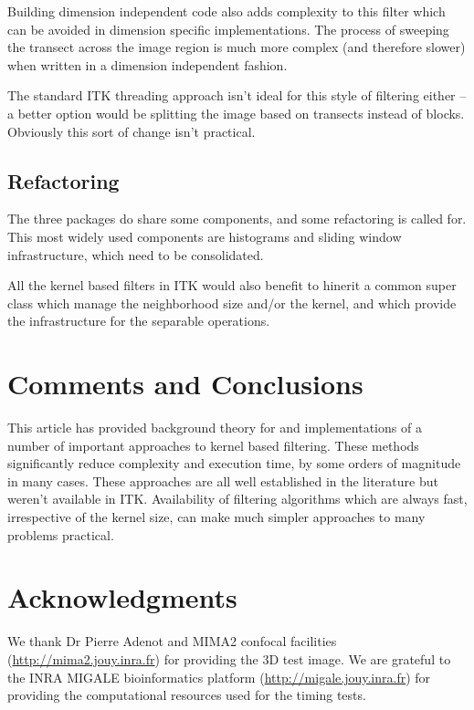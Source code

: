\documentclass{InsightArticle}
\begin{document}
Building dimension independent code also adds complexity to this filter which can be avoided in
dimension specific implementations. The process of sweeping the transect across the image region
is much more complex (and therefore slower) when written in a dimension independent fashion.

The standard ITK threading approach isn't ideal for this style of filtering either -- a better 
option would be splitting the image based on transects instead of blocks. Obviously this
sort of change isn't practical.

\subsection{Refactoring}
The three packages do share some components, and some refactoring is
called for. This most widely used components are histograms and
sliding window infrastructure, which need to be consolidated.

All the kernel based filters in ITK would also benefit to hinerit a common
super class which manage the neighborhood size and/or the kernel, and which
provide the infrastructure for the separable operations.

\section{Comments and Conclusions}
This article has provided background theory for and implementations of
a number of important approaches to kernel based filtering. These
methods significantly reduce complexity and execution time, by some
orders of magnitude in many cases. These approaches are all well
established in the literature but weren't available in
ITK. Availability of filtering algorithms which are always fast,
irrespective of the kernel size, can make much simpler approaches to
many problems practical.

\section{Acknowledgments}
We thank Dr Pierre Adenot and MIMA2 confocal facilities
(\url{http://mima2.jouy.inra.fr}) for providing the 3D test image.
We are grateful to the INRA MIGALE bioinformatics platform
(\url{http://migale.jouy.inra.fr}) for providing the computational resources
used for the timing tests.
\appendix





\nocite{ITKSoftwareGuide}
\end{document}
